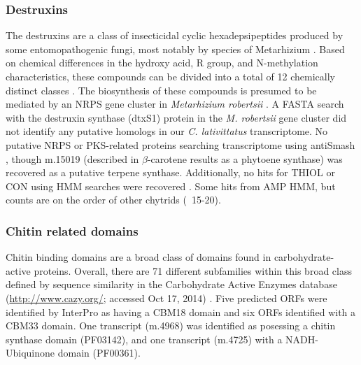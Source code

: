 \subsubsection*{Destruxins}
The destruxins are a class of insecticidal cyclic hexadepsipeptides produced by some entomopathogenic fungi, most notably by species of Metarhizium \cite{Donzelli2012,Wang2012}. Based on chemical differences in the hydroxy acid, R group, and N-methylation characteristics, these compounds can be divided into a total of 12 chemically distinct classes \cite{Pedras2002,Wang2012}. The biosynthesis of these compounds is presumed to be mediated by an NRPS gene cluster in \textit{Metarhizium robertsii} \cite{Wang2012}. A FASTA search with the destruxin synthase (dtxS1) protein in the \textit{M. robertsii} gene cluster did not identify any putative homologs in our \textit{C. lativittatus} transcriptome. No putative NRPS or PKS-related proteins searching transcriptome using antiSmash \cite{Blin2013}, though m.15019 (described in $\beta$-carotene results as a phytoene synthase) was recovered as a putative terpene synthase. Additionally, no hits for THIOL or CON using HMM searches were recovered \cite{Bushley2010}. Some hits from AMP HMM, but counts are on the order of other chytrids (~15-20).\\
\subsubsection*{Chitin related domains}
Chitin binding domains are a broad class of domains found in carbohydrate-active proteins. Overall, there are 71 different subfamilies within this broad class defined by sequence similarity in the Carbohydrate Active Enzymes database (\url{http://www.cazy.org/}; accessed Oct 17, 2014) \cite{Lombard2014}. Five predicted ORFs were identified by InterPro as having a CBM18 domain and six ORFs identified with a CBM33 domain. One transcript (m.4968) was identified as posessing a chitin synthase domain (PF03142), and one transcript (m.4725) with a NADH-Ubiquinone domain (PF00361).\\
